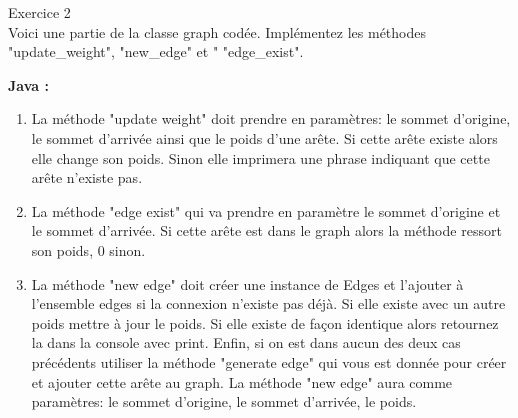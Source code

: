 \begin{Exercice} Exercice 2\\

Voici une partie de la classe graph codée. Implémentez les méthodes "update\_weight", "new\_edge" et " "edge\_exist".

\textbf{Java :}
         
    \begin{enumerate}
        \item La méthode "update weight" doit prendre en paramètres: le sommet d'origine, le sommet d'arrivée ainsi que le poids d'une arête. Si cette arête existe alors elle change son poids. Sinon elle imprimera une phrase indiquant que cette arête n'existe pas.
        \item La méthode "edge exist" qui va prendre en paramètre le sommet d'origine et le sommet d'arrivée. Si cette arête est dans le graph alors la méthode ressort son poids, 0 sinon.
        \item La méthode "new edge" doit créer une instance de Edges et l'ajouter à l'ensemble edges si la connexion n'existe pas déjà. Si elle existe avec un autre poids mettre à jour le poids. Si elle existe de façon identique alors retournez la dans la console avec print. Enfin, si on est dans aucun des deux cas précédents utiliser la méthode "generate edge" qui vous est donnée pour créer et ajouter cette arête au graph. La méthode "new edge" aura comme paramètres: le sommet d'origine, le sommet d'arrivée, le poids.
    \end{enumerate}


\end{Exercice}
